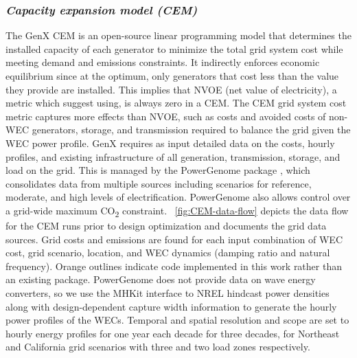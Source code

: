 \documentclass[10pt,twoside]{article}
\begin{document}
\subsubsection{\textit{Capacity expansion model (CEM)}}
The GenX CEM \cite{bonaldo_genxprojectgenxjl_2025} is an open-source linear programming model that determines the installed capacity of each generator to minimize the total grid system cost while meeting demand and emissions constraints.
It indirectly enforces economic equilibrium since at the optimum, only generators that cost less than the value they provide are installed.
This implies that NVOE (net value of electricity), a metric which \cite{mowers_evaluation_2021,mccabe_system_2023} suggest using, is always zero in a CEM.
The CEM grid system cost metric captures more effects than NVOE, such as costs and avoided costs of non-WEC generators, storage, and transmission required to balance the grid given the WEC power profile.
GenX requires as input detailed data on the costs, hourly profiles, and existing infrastructure of all generation, transmission, storage, and load on the grid.
This is managed by the PowerGenome package \cite{schivley_powergenomepowergenome_2025}, which consolidates data from multiple sources including scenarios for reference, moderate, and high levels of electrification.
PowerGenome also allows control over a grid-wide maximum CO\textsubscript{2} constraint.
\figureautorefname~\ref{fig:CEM-data-flow} depicts the data flow for the CEM runs prior to design optimization and documents the grid data sources.
Grid costs and emissions are found for each input combination of WEC cost, grid scenario, location, and WEC dynamics (damping ratio and natural frequency).
Orange outlines indicate code implemented in this work rather than an existing package.
PowerGenome does not provide data on wave energy converters, so we use the MHKit interface \cite{klise_mhkit_2020} to NREL hindcast power densities \cite{wu_development_2020,allahdadi_development_2019} along with design-dependent capture width information to generate the hourly power profiles of the WECs. 
Temporal and spatial resolution and scope are set to hourly energy profiles for one year each decade for three decades, for Northeast and California grid scenarios with three and two load zones respectively.
\end{document}
